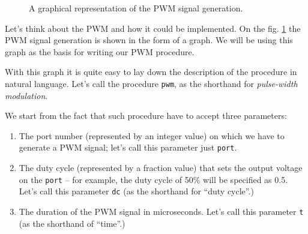 \documentclass[../sparc.tex]{subfiles}
\begin{document}
\begin{figure}[ht]
  \caption{A graphical representation of the PWM signal generation.}
  \label{fig:pwm-graph}
\end{figure}

Let's think about the \gls{PWM} and how it could be implemented.  On the
fig. \ref{fig:pwm-graph} the PWM signal generation is shown in the form of a
graph.  We will be using this graph as the basis for writing our PWM procedure.

With this graph it is quite easy to lay down the description of the procedure in
natural language.  Let's call the procedure \texttt{pwm}, as the shorthand for
\emph{pulse-width modulation}.

We start from the fact that such procedure have to accept three parameters:

\begin{enumerate}
\item The port number (represented by an integer value) on which we have to
  generate a PWM signal; let's call this parameter just \texttt{port}.
\item The duty cycle (represented by a fraction value) that sets the output
  voltage on the \texttt{port} -- for example, the duty cycle of 50\% will be
  specified as 0.5.  Let's call this parameter \texttt{dc} (as the shorthand for
  ``duty cycle''.)
\item The duration of the PWM signal in microseconds.  Let's call this parameter
  \texttt{t} (as the shorthand of ``time''.)
\end{enumerate}
\end{document}
